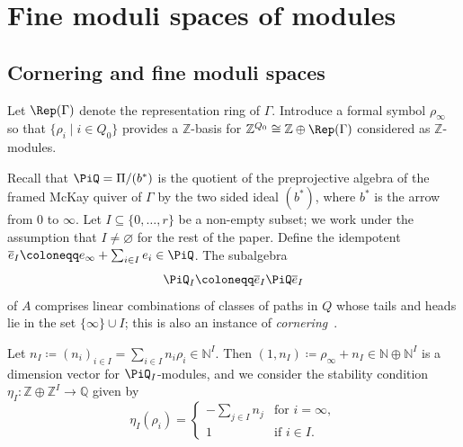 \section{Fine moduli spaces of modules}
\label{subsec:finemod}

\subsection{Cornering and fine moduli spaces}

Let $\Rep(\Gamma)$
denote the representation ring of $\Gamma$. Introduce a formal symbol $\rho_{\infty}$ so that $\{\rho_i \mid i \in Q_0\}$ provides a $\mathbb{Z}$-basis for $\mathbb{Z}^{Q_0}\cong \mathbb{Z}\oplus \Rep(\Gamma)$ considered as $\mathbb{Z}$-modules.

Recall that $\PiQ=\Pi/(b^{\ast})$ is the quotient of the
preprojective algebra of the framed McKay quiver of $\Gamma$ by the two sided ideal $(b^{\ast})$, where $b^\ast$ is the arrow from $0$ to $\infty$.
Let $I \subseteq \{0, \dots , r\}$ be a non-empty subset; we work under the assumption that $I\ne \varnothing$ for the rest of the paper.
Define the idempotent $\overline{e}_I \coloneqq e_{\infty} + \sum_{i \in I} e_i \in \PiQ$.
The subalgebra
\begin{equation}\label{eqn:AI}
\PiQ_I \coloneqq \overline{e}_I \PiQ \overline{e}_I
\end{equation}
of $A$ comprises linear combinations of
classes of paths in $Q$ whose tails and heads lie in the set $\{\infty\} \cup I$; this is also an instance of \emph{cornering}~\cite[Remark~3.1]{craw2018multigraded}.

Let
$n_I \coloneqq {(n_i)_{i\in I}}= \sum_{i \in I} n_i \rho_i \in \mathbb{N}^{I}$.
Then $(1,n_I)\coloneqq\rho_{\infty} +n_I \in \mathbb{N} \oplus \mathbb{N}^{I}$
is a dimension vector for $\PiQ_I$-modules, and we consider the stability condition $\eta_{I}\colon \mathbb{Z} \oplus \mathbb{Z}^{I} \to \mathbb{Q}$
given by
\begin{equation}
 \label{eqn:etaI}
\eta_I (\rho_i) =
\begin{cases}
\displaystyle -\sum_{j \in I} n_j & \textrm{for } i= \infty, \\
1 & \textrm{if }i \in I.
\end{cases}
\end{equation}


